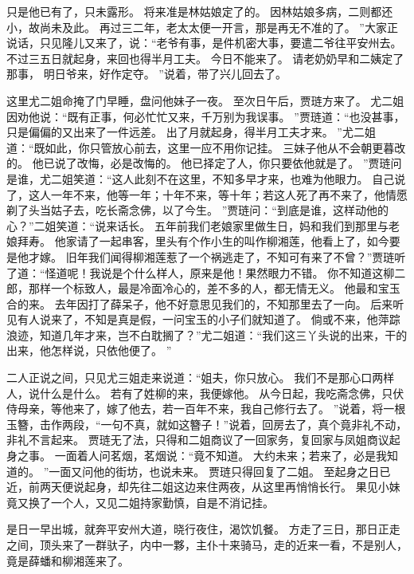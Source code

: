 只是他已有了，只未露形。
将来准是林姑娘定了的。
因林姑娘多病，二则都还小，故尚未及此。
再过三二年，老太太便一开言，那是再无不准的了。
”大家正说话，只见隆儿又来了，说：“老爷有事，是件机密大事，要遣二爷往平安州去。
不过三五日就起身，来回也得半月工夫。
今日不能来了。
请老奶奶早和二姨定了那事，
明日爷来，好作定夺。
”说着，带了兴儿回去了。
\par
这里尤二姐命掩了门早睡，盘问他妹子一夜。
至次日午后，贾琏方来了。
尤二姐因劝他说：“既有正事，何必忙忙又来，千万别为我误事。
”贾琏道：“也没甚事，只是偏偏的又出来了一件远差。
出了月就起身，得半月工夫才来。
”尤二姐道：“既如此，你只管放心前去，这里一应不用你记挂。
三妹子他从不会朝更暮改的。
他已说了改悔，必是改悔的。
他已择定了人，你只要依他就是了。
”贾琏问是谁，尤二姐笑道：“这人此刻不在这里，不知多早才来，也难为他眼力。
自己说了，这人一年不来，他等一年；十年不来，等十年；若这人死了再不来了，他情愿剃了头当姑子去，吃长斋念佛，以了今生。
”贾琏问：“到底是谁，这样动他的心？”二姐笑道：“说来话长。
五年前我们老娘家里做生日，妈和我们到那里与老娘拜寿。
他家请了一起串客，里头有个作小生的叫作柳湘莲，他看上了，如今要是他才嫁。
旧年我们闻得柳湘莲惹了一个祸逃走了，不知可有来了不曾？”贾琏听了道：“怪道呢！我说是个什么样人，原来是他！果然眼力不错。
你不知道这柳二郎，那样一个标致人，最是冷面冷心的，差不多的人，都无情无义。
他最和宝玉合的来。
去年因打了薛呆子，他不好意思见我们的，不知那里去了一向。
后来听见有人说来了，不知是真是假，一问宝玉的小子们就知道了。
倘或不来，他萍踪浪迹，知道几年才来，岂不白耽搁了？”尤二姐道：“我们这三丫头说的出来，干的出来，他怎样说，只依他便了。
”\par
二人正说之间，只见尤三姐走来说道：“姐夫，你只放心。
我们不是那心口两样人，说什么是什么。
若有了姓柳的来，我便嫁他。
从今日起，我吃斋念佛，只伏侍母亲，等他来了，嫁了他去，若一百年不来，我自己修行去了。
”说着，将一根玉簪，击作两段，“一句不真，就如这簪子！”说着，回房去了，真个竟非礼不动，非礼不言起来。
贾琏无了法，只得和二姐商议了一回家务，复回家与凤姐商议起身之事。
一面着人问茗烟，茗烟说：“竟不知道。
大约未来；若来了，必是我知道的。
”一面又问他的街坊，也说未来。
贾琏只得回复了二姐。
至起身之日已近，前两天便说起身，却先往二姐这边来住两夜，从这里再悄悄长行。
果见小妹竟又换了一个人，又见二姐持家勤慎，自是不消记挂。
\par
是日一早出城，就奔平安州大道，晓行夜住，渴饮饥餐。
方走了三日，那日正走之间，顶头来了一群驮子，内中一夥，主仆十来骑马，走的近来一看，不是别人，竟是薛蟠和柳湘莲来了。
